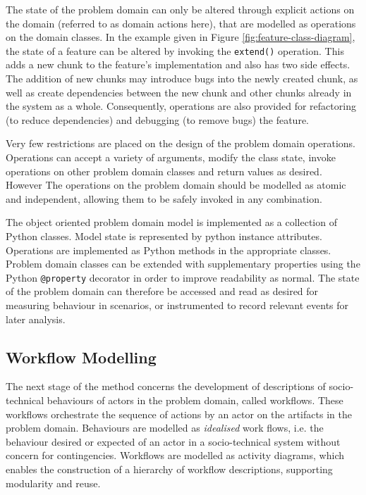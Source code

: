 \documentclass{sig-alternate}
\begin{document}
The state of the problem domain can only be altered through explicit actions on
the domain (referred to as domain actions here), that are modelled as operations
on the domain classes.  In the example given in Figure \ref{fig:feature-class-diagram},
the state of a feature can be altered by invoking the \lstinline!extend()!
operation.  This adds a new chunk to the feature's implementation and also has
two side effects. The addition of new chunks may introduce bugs into the newly
created chunk, as well as create dependencies between the new chunk and other
chunks already in the system as a whole.  Consequently, operations are also
provided for refactoring (to reduce dependencies) and debugging (to remove bugs)
the feature.

Very few restrictions are placed on the design of the problem domain operations.
Operations can accept a variety of arguments, modify the class state, invoke
operations on other problem domain classes and return values as desired.
However The operations on the problem domain should be modelled as atomic and
independent, allowing them to be safely invoked in any combination.

The object oriented problem domain model is implemented as a collection of
Python classes.  Model state is represented by python instance attributes.
Operations are implemented as Python methods in the appropriate classes.
Problem domain classes can be extended with supplementary properties using the
Python \lstinline!@property! decorator in order to improve readability as
normal.  The state of the problem domain can therefore be accessed and read as
desired for measuring behaviour in scenarios, or instrumented to record relevant
events for later analysis.


\subsection{Workflow Modelling}
\label{sec:fuzzi-moss}


The next stage of the method concerns the development of descriptions of
socio-technical behaviours of actors in the problem domain, called workflows.
These workflows orchestrate the sequence of actions by an actor on the artifacts
in the problem domain.  Behaviours are modelled as \emph{idealised} work flows,
i.e. the behaviour desired or expected of an actor in a socio-technical system
without concern for contingencies.  Workflows are modelled as activity diagrams,
which enables the construction of a hierarchy of workflow descriptions,
supporting modularity and reuse.
\end{document}
